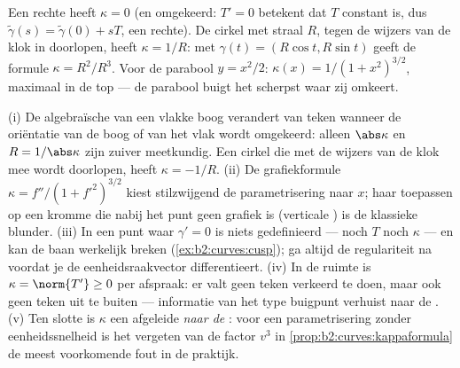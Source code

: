\begin{example}\label{ex:b2:curves:kappaexamples}
Een rechte heeft $\kappa = 0$ (en omgekeerd: $T' = 0$ betekent dat
$T$ constant is, dus $\tilde\gamma(s) = \tilde\gamma(0) + sT$, een
rechte). De cirkel met straal $R$, tegen de wijzers van de klok in
doorlopen, heeft $\kappa = 1/R$: met $\gamma(t) = (R\cos t, R\sin
t)$ geeft de formule $\kappa = R^2/R^3$. Voor de parabool $y =
x^2/2$: $\kappa(x) = 1/(1 + x^2)^{3/2}$, maximaal in de top --- de
parabool buigt het scherpst waar zij omkeert.
\end{example}

\begin{remark}
(i) De algebraïsche  van een vlakke boog verandert van
teken wanneer de oriëntatie van de boog of van het vlak wordt
omgekeerd: alleen $\abs\kappa$ en $R = 1/\abs\kappa$ zijn zuiver
meetkundig. Een cirkel die met de wijzers van de klok mee wordt
doorlopen, heeft $\kappa = -1/R$. (ii) De grafiekformule $\kappa =
f''/(1 + f'^2)^{3/2}$ kiest stilzwijgend de parametrisering naar
$x$; haar toepassen op een kromme die nabij het punt geen grafiek
is (verticale ) is de klassieke blunder. (iii) In een punt
waar $\gamma' = 0$ is niets gedefinieerd --- noch $T$ noch $\kappa$
--- en kan de baan werkelijk breken
(\cref{ex:b2:curves:cusp}); ga altijd de regulariteit na voordat je
de eenheidsraakvector differentieert. (iv) In de ruimte is $\kappa
= \norm{T'} \geq 0$ per afspraak: er valt geen teken verkeerd te
doen, maar ook geen teken uit te buiten --- informatie van het type
buigpunt verhuist naar de . (v) Ten slotte is $\kappa$ een
afgeleide \emph{naar de }: voor een parametrisering
zonder eenheidssnelheid is het vergeten van de factor $v^3$ in
\cref{prop:b2:curves:kappaformula} de meest voorkomende fout in de
praktijk.
\end{remark}

